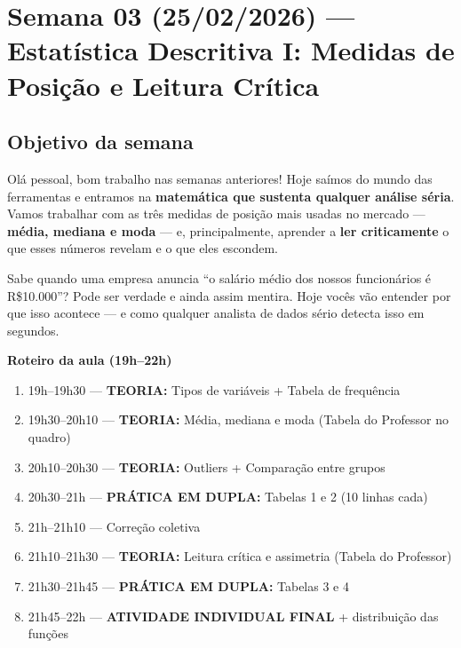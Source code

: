 
\chapter{Semana 03 (25/02/2026) — Estatística Descritiva I: Medidas de Posição e Leitura Crítica}

\section{Objetivo da semana}

Olá pessoal, bom trabalho nas semanas anteriores! Hoje saímos do mundo das
ferramentas e entramos na \textbf{matemática que sustenta qualquer análise
séria}. Vamos trabalhar com as três medidas de posição mais usadas no mercado
— \textbf{média, mediana e moda} — e, principalmente, aprender a
\textbf{ler criticamente} o que esses números revelam e o que eles escondem.

Sabe quando uma empresa anuncia ``o salário médio dos nossos funcionários é
R\$10.000''? Pode ser verdade e ainda assim mentira. Hoje vocês vão entender
por que isso acontece — e como qualquer analista de dados sério detecta isso
em segundos.

\begin{BoardBox}
\textbf{Roteiro da aula (19h–22h)}
\begin{enumerate}
  \item 19h–19h30 — \textbf{TEORIA:} Tipos de variáveis + Tabela de frequência
  \item 19h30–20h10 — \textbf{TEORIA:} Média, mediana e moda (Tabela do Professor no quadro)
  \item 20h10–20h30 — \textbf{TEORIA:} Outliers + Comparação entre grupos
  \item 20h30–21h — \textbf{PRÁTICA EM DUPLA:} Tabelas 1 e 2 (10 linhas cada)
  \item 21h–21h10 — Correção coletiva
  \item 21h10–21h30 — \textbf{TEORIA:} Leitura crítica e assimetria (Tabela do Professor)
  \item 21h30–21h45 — \textbf{PRÁTICA EM DUPLA:} Tabelas 3 e 4
  \item 21h45–22h — \textbf{ATIVIDADE INDIVIDUAL FINAL} + distribuição das funções
\end{enumerate}
\end{BoardBox}

